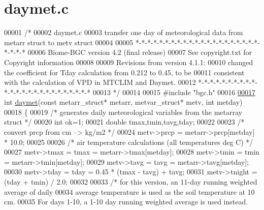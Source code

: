 \hypertarget{daymet_8c_source}{}\section{daymet.\+c}
\label{daymet_8c_source}

\begin{DoxyCode}
00001 \textcolor{comment}{/* }
00002 \textcolor{comment}{daymet.c}
00003 \textcolor{comment}{transfer one day of meteorological data from metarr struct to metv struct}
00004 \textcolor{comment}{}
00005 \textcolor{comment}{*-*-*-*-*-*-*-*-*-*-*-*-*-*-*-*-*-*-*-*-*-*-*-*-*}
00006 \textcolor{comment}{Biome-BGC version 4.2 (final release)}
00007 \textcolor{comment}{See copyright.txt for Copyright information}
00008 \textcolor{comment}{}
00009 \textcolor{comment}{Revisions from version 4.1.1:}
00010 \textcolor{comment}{    changed the coefficient for Tday calculation from 0.212 to 0.45, to be}
00011 \textcolor{comment}{    consistent with the calculation of VPD in MTCLIM and Daymet.}
00012 \textcolor{comment}{*-*-*-*-*-*-*-*-*-*-*-*-*-*-*-*-*-*-*-*-*-*-*-*-*}
00013 \textcolor{comment}{*/}
00014 
00015 \textcolor{preprocessor}{#include "bgc.h"}
00016 
\hypertarget{daymet_8c_source_l00017}{}\hyperlink{daymet_8c_a6bd13f3e81d358675fd203d695b05630}{00017} \textcolor{keywordtype}{int} \hyperlink{daymet_8c_a6bd13f3e81d358675fd203d695b05630}{daymet}(\textcolor{keyword}{const} metarr\_struct* metarr, metvar\_struct* metv, \textcolor{keywordtype}{int} metday)
00018 \{
00019     \textcolor{comment}{/* generates daily meteorological variables from the metarray struct */}
00020     \textcolor{keywordtype}{int} ok=1;
00021     \textcolor{keywordtype}{double} tmax,tmin,tavg,tday;
00022     
00023     \textcolor{comment}{/* convert prcp from cm --> kg/m2 */}
00024     metv->prcp = metarr->prcp[metday] * 10.0;
00025 
00026     \textcolor{comment}{/* air temperature calculations (all temperatures deg C) */}
00027     metv->tmax = tmax = metarr->tmax[metday];
00028     metv->tmin = tmin = metarr->tmin[metday];
00029     metv->tavg = tavg = metarr->tavg[metday];
00030     metv->tday = tday = 0.45 * (tmax - tavg) + tavg;
00031     metv->tnight = (tday + tmin) / 2.0;
00032 
00033     \textcolor{comment}{/* for this version, an 11-day running weighted average of daily}
00034 \textcolor{comment}{    average temperature is used as the soil temperature at 10 cm.}
00035 \textcolor{comment}{    For days 1-10, a 1-10 day running weighted average is used instead.}

\end{DoxyCode}
